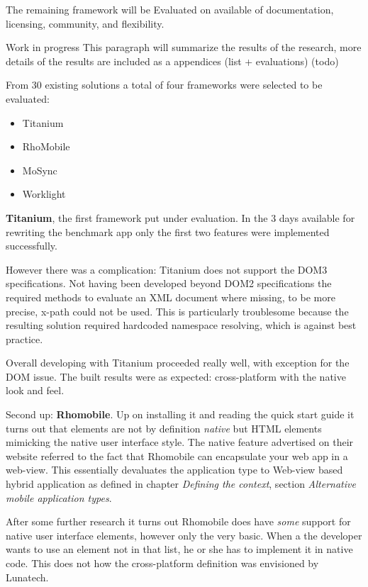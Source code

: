 The remaining framework will be Evaluated on available of documentation, licensing, community, and flexibility.

Work in progress
This paragraph will summarize the results of the research, more details of the results are included as a appendices (list + evaluations) (todo)%

From 30 existing solutions a total of four frameworks were selected to be evaluated:
\begin{itemize}
	\item Titanium
	\item RhoMobile
	\item MoSync
	\item Worklight
\end{itemize} 



{\bf Titanium}, the first framework put under evaluation. In the 3 days available for rewriting the benchmark app only the first two features were implemented successfully.

However there was a complication: Titanium does not support the DOM3 specifications. Not having been developed beyond DOM2 specifications the required methods to evaluate an XML document where missing, to be more precise, x-path could not be used. This is particularly troublesome because the resulting solution required hardcoded namespace resolving, which is against best practice. %

Overall developing with Titanium proceeded really well, with exception for the DOM issue. The built results were as expected: cross-platform with the native look and feel.

Second up: {\bf Rhomobile}. Up on installing it and reading the quick start guide it turns out that elements are not by definition \emph{native} but HTML elements mimicking the native user interface style. The native feature advertised on their website referred to the fact that Rhomobile can encapsulate your web app in a web-view. This essentially devaluates the application type to Web-view based hybrid application as defined in chapter \emph{Defining the context}, section \emph{Alternative mobile application types}.

After some further research it turns out Rhomobile does have \emph{some} support for native user interface elements, however only the very basic. When a the developer wants to use an element not in that list, he or she has to implement it in native code. \cite{Rhomobile2012} This does not how the cross-platform definition was envisioned by Lunatech.

